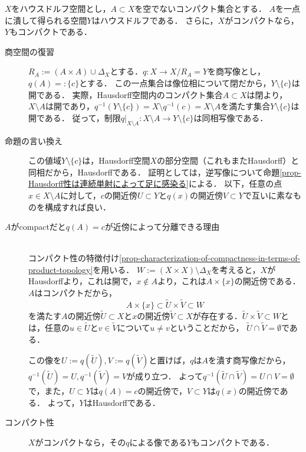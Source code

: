 \documentclass[uplatex,dvipdfmx]{jsreport}
\begin{document}
\begin{proposition}[ハウスドルフはコンパクト集合を一点に潰してもハウスドルフである]\label{prop-compact-Hausdorff-after-one-point-quotient-map}
    $X$をハウスドルフ空間とし，$A\subset X$を空でないコンパクト集合とする．
    $A$を一点に潰して得られる空間$Y$はハウスドルフである．
    さらに，$X$がコンパクトなら，$Y$もコンパクトである．
\end{proposition}
\begin{Proof}\mbox{}
    \begin{description}
        \item[商空間の復習] 
        $R_A:=(A\times A)\cup\Delta_X$とする．$q:X\to X/R_A=Y$を商写像とし，$q(A)=:\{c\}$とする．
        この一点集合は像位相について閉だから，$Y\setminus\{c\}$は開である．
        実際，Hausdorff空間内のコンパクト集合$A\subset X$は閉より，$X\setminus A$は開であり，$q^{-1}(Y\setminus\{c\})=X\setminus q^{-1}(c)=X\setminus A$を満たす集合$Y\setminus\{c\}$は開である．
        従って，制限$q|_{X\setminus A}:X\setminus A\to Y\setminus\{c\}$は同相写像である．
        \item[命題の言い換え]
        この値域$Y\setminus\{c\}$は，Hausdorff空間$X$の部分空間（これもまたHausdorff）と同相だから，Hausdorffである．
        証明としては，逆写像について命題\ref{prop-Hausdorff性は連続単射によって足に感染る}による．
        以下，任意の点$x\in X\setminus A$に対して，$c$の開近傍$U\subset Y$と$q(x)$の開近傍$V\subset Y$で互いに素なものを構成すれば良い．
        \item[$A$がcompactだと$q(A)=c$が近傍によって分離できる理由] \mbox{}\\
        コンパクト性の特徴付け\ref{prop-characterization-of-compactness-in-terms-of-product-topology}を用いる．
        $W:=(X\times X)\setminus\Delta_X$を考えると，$X$がHausdorffより，これは開で，$x\notin A$より，これは$A\times\{x\}$の開近傍である．
        $A$はコンパクトだから，
        \[A\times\{x\}\subset\tilde{U}\times\tilde{V}\subset W\]
        を満たす$A$の開近傍$\tilde{U}\subset X$と$x$の開近傍$\tilde{V}\subset X$が存在する．$\tilde{U}\times\tilde{V}\subset W$とは，任意の$u\in\tilde{U}$と$v\in\tilde{V}$について$u\ne v$ということだから，
        $\tilde{U}\cap\tilde{V}=\emptyset$である．

        この像を$U:=q(\tilde{U}),V:=q(\tilde{V})$と置けば，$q$は$A$を潰す商写像だから，$q^{-1}(\tilde{U})=U,q^{-1}(\tilde{V})=V$が成り立つ．
        よって$q^{-1}(\tilde{U}\cap\tilde{V})=U\cap V=\emptyset$で，また，$U\subset Y$は$q(A)=c$の開近傍で，$V\subset Y$は$q(x)$の開近傍である．
        よって，$Y$はHausdorffである．
        \item[コンパクト性] $X$がコンパクトなら，その$q$による像である$Y$もコンパクトである．
    \end{description}
\end{Proof}
\end{document}
